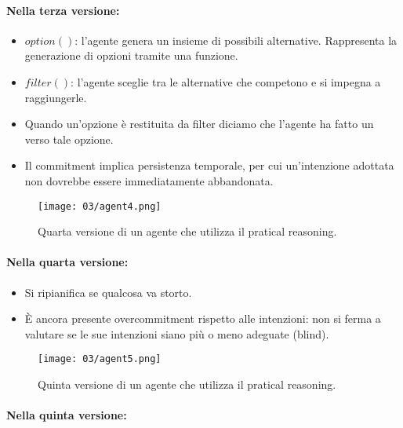 \paragraph{Nella terza versione:}

\begin{itemize}
  \item $option()$: l'agente genera un insieme di possibili alternative. Rappresenta la generazione di opzioni tramite una funzione. 
  \item $filter()$: l'agente sceglie tra le alternative che competono e si impegna a raggiungerle. 
  \item Quando un'opzione è restituita da filter diciamo che l'agente ha fatto un  verso tale opzione. 
  \item Il commitment implica persistenza temporale, per cui un'intenzione adottata non dovrebbe essere immediatamente abbandonata.
\end{itemize}



\begin{figure}[!h]
    \centering
    \texttt{[image: 03/agent4.png]}
  \caption{Quarta versione di un agente che utilizza il pratical reasoning.}
\end{figure}

\paragraph{Nella quarta versione:}

\begin{itemize}
  \item Si ripianifica se qualcosa va storto. 
  \item È ancora presente overcommitment rispetto alle intenzioni: non si ferma a valutare se le sue intenzioni siano più o meno adeguate (blind). 
\end{itemize}
\pagebreak
\begin{figure}[!h]
    \centering
    \texttt{[image: 03/agent5.png]}
  \caption{Quinta versione di un agente che utilizza il pratical reasoning.}
\end{figure}

\paragraph{Nella quinta versione:}


